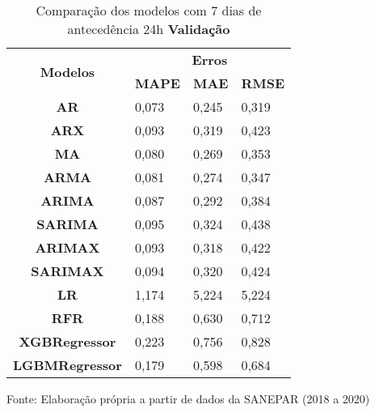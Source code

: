 \begin{table}[H]
	\centering
	\caption{Comparação dos modelos com 7 dias de antecedência 24h \textbf{Validação} }\label{tb:10-24vld}
	\begin{tabular}{@{}clll@{}}
		\toprule
		\multirow{2}{*}{\textbf{Modelos}} & \multicolumn{3}{c}{\textbf{Erros}}                                                                       \\ \cmidrule(l){2-4} 
		& \multicolumn{1}{c}{\textbf{MAPE}} & \multicolumn{1}{c}{\textbf{MAE}} & \multicolumn{1}{c}{\textbf{RMSE}} \\ \hline
\textbf{AR}                       & 0,073                             & 0,245                            & 0,319                             \\
\textbf{ARX}                      & 0,093                             & 0,319                            & 0,423                             \\
\textbf{MA}                       & 0,080                             & 0,269                            & 0,353                             \\
\textbf{ARMA}                     & 0,081                             & 0,274                            & 0,347                             \\
\textbf{ARIMA}                    & 0,087                             & 0,292                            & 0,384                             \\
\textbf{SARIMA}                   & 0,095                             & 0,324                            & 0,438                             \\
\textbf{ARIMAX}                   & 0,093                             & 0,318                            & 0,422                             \\
\textbf{SARIMAX}                  & 0,094                             & 0,320                            & 0,424                             \\
\textbf{LR}                       & 1,174                             & 5,224                            & 5,224                             \\
\textbf{RFR}                      & 0,188                             & 0,630                            & 0,712                             \\
\textbf{XGBRegressor}             & 0,223                             & 0,756                            & 0,828                             \\
\textbf{LGBMRegressor}            & 0,179                             & 0,598                            & 0,684                             \\ \bottomrule
	\end{tabular}

Fonte: Elaboração própria a partir de dados da SANEPAR (2018 a 2020)
\end{table}

